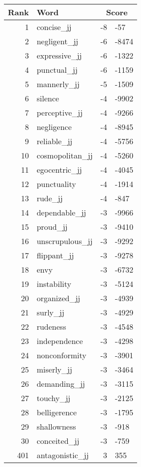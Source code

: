 \begin{longtable}[!htbp]{| rlr@{.}l |}
    \hline
    \textbf{Rank} & \textbf{Word} & \multicolumn{2}{c|}{\textbf{Score}} \\
    \hline
    \endhead
    1 & concise\_jj & -8 & -57 \\
    2 & negligent\_jj & -6 & -8474 \\
    3 & expressive\_jj & -6 & -1322 \\
    4 & punctual\_jj & -6 & -1159 \\
    5 & mannerly\_jj & -5 & -1509 \\
    6 & silence & -4 & -9902 \\
    7 & perceptive\_jj & -4 & -9266 \\
    8 & negligence & -4 & -8945 \\
    9 & reliable\_jj & -4 & -5756 \\
    10 & cosmopolitan\_jj & -4 & -5260 \\
    11 & egocentric\_jj & -4 & -4045 \\
    12 & punctuality & -4 & -1914 \\
    13 & rude\_jj & -4 & -847 \\
    14 & dependable\_jj & -3 & -9966 \\
    15 & proud\_jj & -3 & -9410 \\
    16 & unscrupulous\_jj & -3 & -9292 \\
    17 & flippant\_jj & -3 & -9278 \\
    18 & envy & -3 & -6732 \\
    19 & instability & -3 & -5124 \\
    20 & organized\_jj & -3 & -4939 \\
    21 & surly\_jj & -3 & -4929 \\
    22 & rudeness & -3 & -4548 \\
    23 & independence & -3 & -4298 \\
    24 & nonconformity & -3 & -3901 \\
    25 & miserly\_jj & -3 & -3464 \\
    26 & demanding\_jj & -3 & -3115 \\
    27 & touchy\_jj & -3 & -2125 \\
    28 & belligerence & -3 & -1795 \\
    29 & shallowness & -3 & -918 \\
    30 & conceited\_jj & -3 & -759 \\
    401 & antagonistic\_jj & 3 & 355 \\

\end{longtable}
